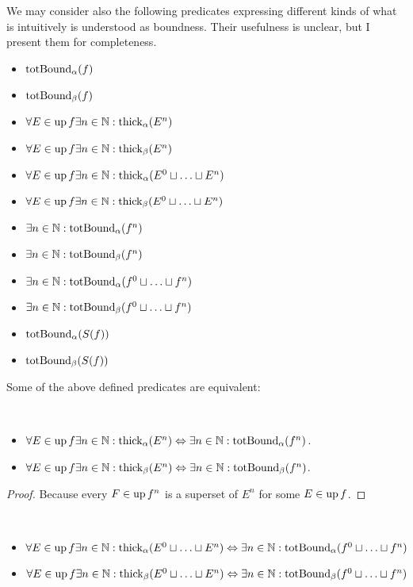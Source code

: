 We may consider also the following predicates expressing different
kinds of what is intuitively is understood as boundness. Their usefulness
is unclear, but I present them for completeness.
\begin{itemize}
\item $\operatorname{totBound}_{\alpha}(f)$
\item $\operatorname{totBound}_{\beta}(f)$
\item $\forall E\in\operatorname{up} f\exists n\in\mathbb{N}:\operatorname{thick}_{\alpha}(E^{n})$
\item $\forall E\in\operatorname{up} f\exists n\in\mathbb{N}:\operatorname{thick}_{\beta}(E^{n})$
\item $\forall E\in\operatorname{up} f\exists n\in\mathbb{N}:\operatorname{thick}_{\alpha}(E^{0}\sqcup\ldots\sqcup E^{n})$
\item $\forall E\in\operatorname{up} f\exists n\in\mathbb{N}:\operatorname{thick}_{\beta}(E^{0}\sqcup\ldots\sqcup E^{n})$
\item $\exists n\in\mathbb{N}:\operatorname{totBound}_{\alpha}(f^{n})$
\item $\exists n\in\mathbb{N}:\operatorname{totBound}_{\beta}(f^{n})$
\item $\exists n\in\mathbb{N}:\operatorname{totBound}_{\alpha}(f^{0}\sqcup\ldots\sqcup f^{n})$
\item $\exists n\in\mathbb{N}:\operatorname{totBound}_{\beta}(f^{0}\sqcup\ldots\sqcup f^{n})$
\item $\operatorname{totBound}_{\alpha}(S(f))$
\item $\operatorname{totBound}_{\beta}(S(f))$
\end{itemize}
Some of the above defined predicates are equivalent:
\begin{prop}
~
\begin{itemize}
\item $\forall E\in\operatorname{up} f\exists n\in\mathbb{N}:\operatorname{thick}_{\alpha}(E^{n})\Leftrightarrow\exists n\in\mathbb{N}:\operatorname{totBound}_{\alpha}(f^{n})$.
\item $\forall E\in\operatorname{up} f\exists n\in\mathbb{N}:\operatorname{thick}_{\beta}(E^{n})\Leftrightarrow\exists n\in\mathbb{N}:\operatorname{totBound}_{\beta}(f^{n})$.
\end{itemize}
\end{prop}
\begin{proof}
Because every $F\in\operatorname{up} f^{n}$ is a superset of $E^{n}$ for some
$E\in\operatorname{up} f$.\end{proof}
\begin{prop}
~
\begin{itemize}
\item $\forall E\in\operatorname{up} f\exists n\in\mathbb{N}:\operatorname{thick}_{\alpha}(E^{0}\sqcup\ldots\sqcup E^{n})\Leftrightarrow\exists n\in\mathbb{N}:\operatorname{totBound}_{\alpha}(f^{0}\sqcup\ldots\sqcup f^{n})$
\item $\forall E\in\operatorname{up} f\exists n\in\mathbb{N}:\operatorname{thick}_{\beta}(E^{0}\sqcup\ldots\sqcup E^{n})\Leftrightarrow\exists n\in\mathbb{N}:\operatorname{totBound}_{\beta}(f^{0}\sqcup\ldots\sqcup f^{n})$
\end{itemize}
\end{prop}
